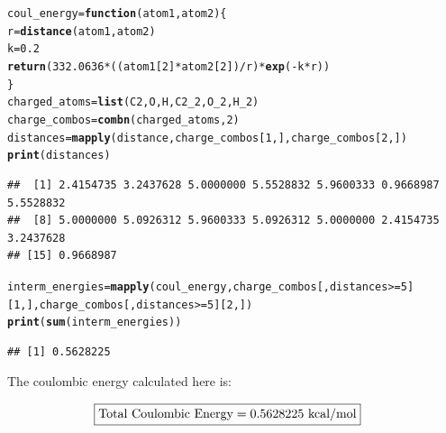 \documentclass{article}\usepackage[]{graphicx}\usepackage[]{color}
\makeatletter
\newcommand{\hlnum}[1]{\textcolor[rgb]{0.686,0.059,0.569}{#1}}%
\newcommand{\hlopt}[1]{\textcolor[rgb]{0,0,0}{#1}}%
\newcommand{\hlstd}[1]{\textcolor[rgb]{0.345,0.345,0.345}{#1}}%
\newcommand{\hlkwa}[1]{\textcolor[rgb]{0.161,0.373,0.58}{\textbf{#1}}}%
\newcommand{\hlkwb}[1]{\textcolor[rgb]{0.69,0.353,0.396}{#1}}%
\newcommand{\hlkwc}[1]{\textcolor[rgb]{0.333,0.667,0.333}{#1}}%
\newcommand{\hlkwd}[1]{\textcolor[rgb]{0.737,0.353,0.396}{\textbf{#1}}}%
\newenvironment{kframe}{%
 \def\at@end@of@kframe{}%
 \ifinner\ifhmode%
  \def\at@end@of@kframe{\end{minipage}}%
  \begin{minipage}{\columnwidth}%
 \fi\fi%
 \def\FrameCommand##1{\hskip\@totalleftmargin \hskip-\fboxsep
 \colorbox{shadecolor}{##1}\hskip-\fboxsep
     \hskip-\linewidth \hskip-\@totalleftmargin \hskip\columnwidth}%
 \MakeFramed {\advance\hsize-\width
   \@totalleftmargin\z@ \linewidth\hsize
   \@setminipage}}%
 {\par\unskip\endMakeFramed%
 \at@end@of@kframe}
\newenvironment{knitrout}{}{} %
\makeatother
\begin{document}
\begin{knitrout}
\color{fgcolor}\begin{kframe}
\begin{alltt}
  \hlstd{coul_energy}\hlkwb{=}\hlkwa{function}\hlstd{(}\hlkwc{atom1}\hlstd{,}\hlkwc{atom2}\hlstd{)\{}
    \hlstd{r}\hlkwb{=}\hlkwd{distance}\hlstd{(atom1,atom2)}
    \hlstd{k}\hlkwb{=}\hlnum{0.2}
    \hlkwd{return}\hlstd{(}\hlnum{332.0636}\hlopt{*}\hlstd{((atom1[}\hlnum{2}\hlstd{]}\hlopt{*}\hlstd{atom2[}\hlnum{2}\hlstd{])}\hlopt{/}\hlstd{r)}\hlopt{*}\hlkwd{exp}\hlstd{(}\hlopt{-}\hlstd{k}\hlopt{*}\hlstd{r))}
  \hlstd{\}}
  \hlstd{charged_atoms} \hlkwb{=} \hlkwd{list}\hlstd{(C2,O,H,C2_2,O_2,H_2)}
  \hlstd{charge_combos} \hlkwb{=} \hlkwd{combn}\hlstd{(charged_atoms,}\hlnum{2}\hlstd{)}
  \hlstd{distances}\hlkwb{=}\hlkwd{mapply}\hlstd{(distance,charge_combos[}\hlnum{1}\hlstd{,],charge_combos[}\hlnum{2}\hlstd{,])}
  \hlkwd{print}\hlstd{(distances)}
\end{alltt}
\begin{verbatim}
##  [1] 2.4154735 3.2437628 5.0000000 5.5528832 5.9600333 0.9668987 5.5528832
##  [8] 5.0000000 5.0926312 5.9600333 5.0926312 5.0000000 2.4154735 3.2437628
## [15] 0.9668987
\end{verbatim}
\begin{alltt}
  \hlstd{interm_energies} \hlkwb{=} \hlkwd{mapply}\hlstd{(coul_energy,charge_combos[,distances}\hlopt{>=}\hlnum{5}\hlstd{][}\hlnum{1}\hlstd{,],charge_combos[,distances}\hlopt{>=}\hlnum{5}\hlstd{][}\hlnum{2}\hlstd{,])}
  \hlkwd{print}\hlstd{(}\hlkwd{sum}\hlstd{(interm_energies))}
\end{alltt}
\begin{verbatim}
## [1] 0.5628225
\end{verbatim}
\end{kframe}
\end{knitrout}

The coulombic energy calculated here is:

\begin{align*}
  \Aboxed{\text{Total Coulombic Energy}=0.5628225\ \text{kcal/mol}}
\end{align*}
\end{document}
